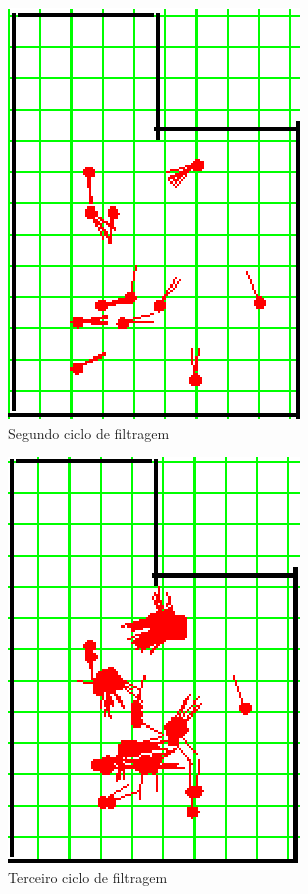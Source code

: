 \begin{figure}[H]
  \centering
  \includegraphics[scale=1]{figuras/cen3_ex5/3.eps}
  \caption[Segundo Ciclo de Filtragem]{Segundo ciclo de filtragem}
  \label{img:cen3_ex5_3}
\end{figure}

\begin{figure}[H]
  \centering
  \includegraphics[scale=1]{figuras/cen3_ex5/4.eps}
  \caption[Terceiro Ciclo de Filtragem]{Terceiro ciclo de filtragem}
  \label{img:cen3_ex5_4}
\end{figure}

